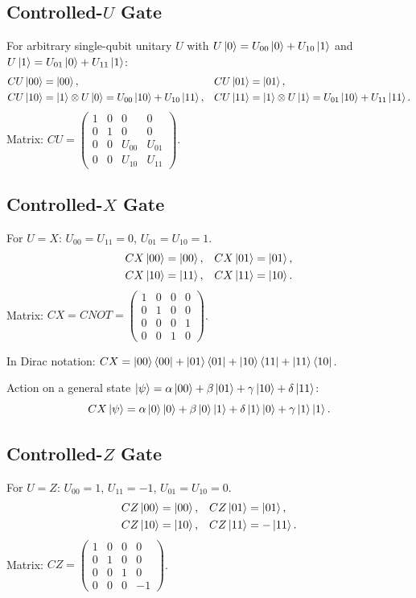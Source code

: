 \documentclass[10pt,a4paper]{article}
\begin{document}
\subsection{Controlled-$U$ Gate}

For arbitrary single-qubit unitary $U$ with $U\ket{0}=U_{00}\ket{0}+U_{10}\ket{1}$ and $U\ket{1}=U_{01}\ket{0}+U_{11}\ket{1}$:
\begin{align*}
CU\ket{00}&=\ket{00}, & CU\ket{01}&=\ket{01}, \\
CU\ket{10}&=\ket{1}\otimes U\ket{0}=U_{00}\ket{10}+U_{10}\ket{11}, & CU\ket{11}&=\ket{1}\otimes U\ket{1}=U_{01}\ket{10}+U_{11}\ket{11}.
\end{align*}
Matrix: $CU=\begin{pmatrix}1&0&0&0\\0&1&0&0\\0&0&U_{00}&U_{01}\\0&0&U_{10}&U_{11}\end{pmatrix}$.

\subsection{Controlled-$X$ Gate}
For $U=X$: $U_{00}=U_{11}=0$, $U_{01}=U_{10}=1$.
\begin{align*}
CX\ket{00}&=\ket{00}, & CX\ket{01}&=\ket{01}, \\
CX\ket{10}&=\ket{11}, & CX\ket{11}&=\ket{10}.
\end{align*}
Matrix: $CX = CNOT =\begin{pmatrix}1&0&0&0\\0&1&0&0\\0&0&0&1\\0&0&1&0\end{pmatrix}$.

In Dirac notation: $CX = \ket{00}\bra{00}+\ket{01}\bra{01}+\ket{10}\bra{11}+\ket{11}\bra{10}$.

Action on a general state $\ket{\psi}=\alpha\ket{00}+\beta\ket{01}+\gamma\ket{10}+\delta\ket{11}$:
\[
CX\ket{\psi} = \alpha\ket{0}\ket{0}+\beta\ket{0}\ket{1}+\delta\ket{1}\ket{0}+\gamma\ket{1}\ket{1}.
\]

\subsection{Controlled-$Z$ Gate}
For $U=Z$: $U_{00}=1$, $U_{11}=-1$, $U_{01}=U_{10}=0$.
\begin{align*}
CZ\ket{00}&=\ket{00}, & CZ\ket{01}&=\ket{01}, \\
CZ\ket{10}&=\ket{10}, & CZ\ket{11}&=-\ket{11}.
\end{align*}
Matrix: $CZ =\begin{pmatrix}1&0&0&0\\0&1&0&0\\0&0&1&0\\0&0&0&-1\end{pmatrix}$.
\end{document}
